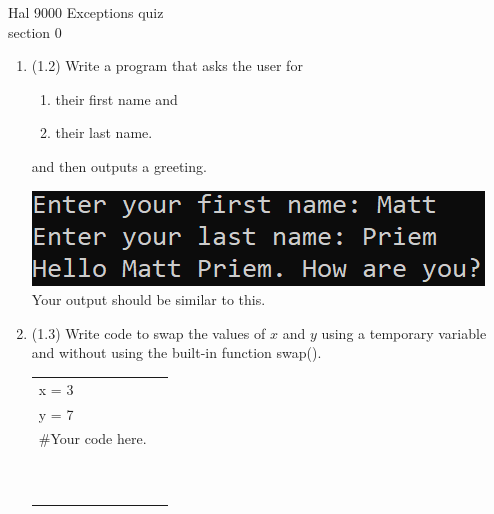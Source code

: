 \documentclass{article}
\begin{document}
\pagebreak
Hal 9000 \hfill Exceptions quiz\\
section 0\\
\begin{enumerate}
\item (1.2) 
		Write a program that asks the user for \\
		\begin{minipage}{0.5\textwidth}
		\vspace*{-0.5em}
			\begin{enumerate}  \setlength\itemsep{-0.3em}
				\item their first name and
				\item their last name.  
			\end{enumerate} \vspace*{-1ex}
		and then outputs a greeting.
		\end{minipage}
		\begin{minipage}{0.5\textwidth}
			\centering
			\includegraphics[scale=0.9]{./imgs/outputGreeting.png}\\
			Your output should be similar to this.
		\end{minipage}


\item (1.3) 
		Write code to swap the values of $x$ and $y$ using a temporary variable and without using
		the built-in function swap().\\		
		\begin{tabular}{|ll}
			\\			
			x = 3\\
			y = 7\\[5pt]
			\#Your code here. \\[5pt]
			& \\ & \\ & \\ & \\ & \\ & \\ & \\ & \\ & \\ & \\ 
		\end{tabular}



\end{enumerate}
\end{document}
